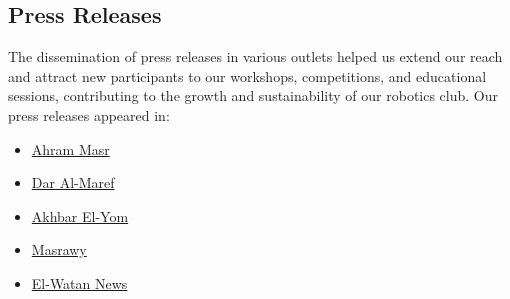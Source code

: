 \documentclass[a4paper,12pt]{article}
\begin{document}
\subsection{Press Releases}
The dissemination of press releases in various outlets helped us extend our reach and attract new participants to our workshops, competitions, and educational sessions, contributing to the growth and sustainability of our robotics club.
Our press releases appeared in:
\begin{itemize}
    \item \href{https://rb.gy/maf8ra}{Ahram Masr}
    \item \href{https://daralmaref.com/News/1604649.aspx}{Dar Al-Maref}
    \item \href{https://rb.gy/n0l5f6}{Akhbar El-Yom}
    \item\href{https://www.elwatannews.com/news/details/7423221#goog_rewarded}{Masrawy}
    \item\href{https://www.elwatannews.com/news/details/7423221#goog_rewarded}{El-Watan News}
\end{itemize}
\end{document}
